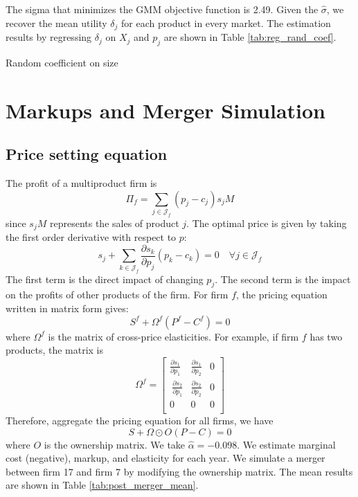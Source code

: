 \documentclass[12pt]{article}[margin=1in]
\begin{document}
The sigma that minimizes the GMM objective function is 2.49. Given the
$\hat{\sigma}$, we recover the mean utility $\delta_j$ for each product in
every market. The estimation results by regressing $\delta_j$ on $X_j$ and
$p_j$ are shown in Table \ref{tab:reg_rand_coef}.

\begin{table}[h!]
    \fontsize{10pt}{12pt}\selectfont
    \centering
    
    \caption{Random coefficient on size}
    \label{tab:reg_rand_coef}
\end{table}

\section{Markups and Merger Simulation}
\subsection{Price setting equation}
The profit of a multiproduct firm is
\begin{equation*}
    \Pi_f = \sum_{j\in \mathcal{J}_f} (p_j - c_j) s_j M
\end{equation*}
since $s_j M$ represents the sales of product $j$. The optimal price is given by taking the first order derivative with respect to $p$:
\begin{equation*}
    s_j + \sum_{k\in \mathcal{J}_f} \frac{\partial s_k}{\partial p_j} (p_k - c_k) = 0 \quad \forall j \in \mathcal{J}_f
\end{equation*}
The first term is the direct impact of changing $p_j$. The second term is the
impact on the profits of other products of the firm.
For firm $f$, the pricing equation written in matrix form gives:
\begin{equation*}
    S^f + \Omega^f (P^f - C^f) = 0
\end{equation*}
where $\Omega^f$ is the matrix of cross-price elasticities.
For example, if firm $f$ has two products, the matrix is $$
    \Omega^f =\begin{bmatrix}
        \frac{\partial s_1}{\partial p_1} & \frac{\partial s_1}{\partial p_2} & 0 \\\ \frac{\partial s_2}{\partial p_1} &\frac{\partial s_2}{\partial p_2} & 0 \\0 & 0 &0\\
    \end{bmatrix}$$
Therefore, aggregate the pricing equation for all firms, we have $$ S + \Omega
    \odot O (P-C) = 0 $$ where $O$ is the ownership matrix.
We take $\hat{\alpha} = -0.098$. We estimate marginal cost (negative), markup,
and elasticity for each year. We simulate a merger between firm 17 and firm 7
by modifying the ownership matrix. The mean results are shown in Table
\ref{tab:post_merger_mean}.
\end{document}
